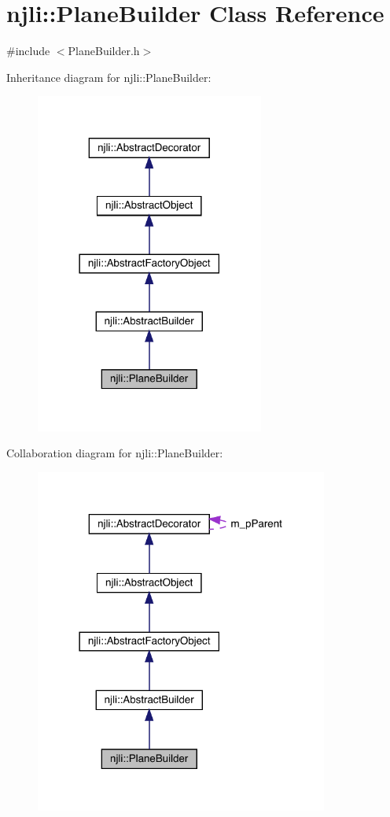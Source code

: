\hypertarget{classnjli_1_1_plane_builder}{}\section{njli\+:\+:Plane\+Builder Class Reference}
\label{classnjli_1_1_plane_builder}


{\ttfamily \#include $<$Plane\+Builder.\+h$>$}



Inheritance diagram for njli\+:\+:Plane\+Builder\+:\nopagebreak
\begin{figure}[H]
\begin{center}
\leavevmode
\includegraphics[width=213pt]{classnjli_1_1_plane_builder__inherit__graph}
\end{center}
\end{figure}


Collaboration diagram for njli\+:\+:Plane\+Builder\+:\nopagebreak
\begin{figure}[H]
\begin{center}
\leavevmode
\includegraphics[width=273pt]{classnjli_1_1_plane_builder__coll__graph}
\end{center}
\end{figure}
